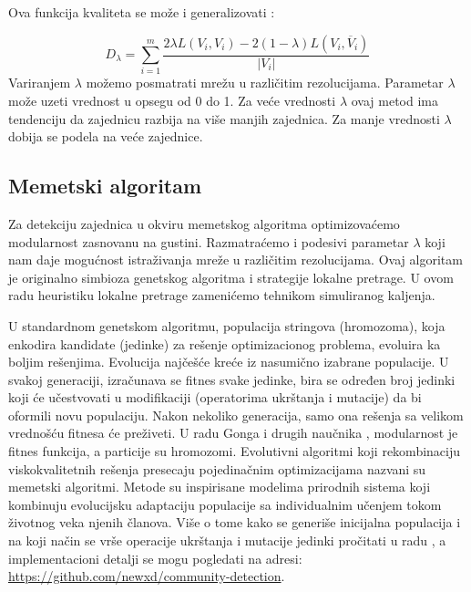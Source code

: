 \documentclass[a4paper]{article}
\begin{document}
Ova funkcija kvaliteta se može i generalizovati \cite{gong2011memetic}:

\begin{equation} D_{\lambda} = \sum_{i = 1}^{m} \frac{2 \lambda L(V_{i},  V_{i}) - 2(1 - \lambda)L(V_{i}, \overline V_{i})}{|V_{i}|} 
\end{equation} Variranjem $\lambda$ možemo posmatrati mrežu u različitim rezolucijama. Parametar $\lambda$ može uzeti vrednost u opsegu od 0 do 1. Za veće vrednosti $\lambda$ ovaj metod ima tendenciju da zajednicu razbija na više manjih zajednica. Za manje vrednosti $\lambda$ dobija se podela na veće zajednice.



\subsection{Memetski algoritam}
Za detekciju zajednica u okviru memetskog  algoritma \cite{gong2011memetic} optimizovaćemo modularnost zasnovanu na gustini. Razmatraćemo i podesivi parametar $\lambda$ koji nam daje mogućnost istraživanja mreže u različitim rezolucijama. Ovaj algoritam je originalno simbioza genetskog algoritma i strategije lokalne pretrage. U ovom radu heuristiku lokalne pretrage zamenićemo tehnikom simuliranog kaljenja. 

U standardnom genetskom algoritmu, populacija stringova (hromozoma), koja enkodira kandidate (jedinke) za rešenje optimizacionog problema, evoluira ka boljim rešenjima. Evolucija najčešće kreće iz nasumično izabrane populacije. U svakoj generaciji, izračunava se fitnes svake jedinke, bira se određen broj jedinki koji će učestvovati u modifikaciji (operatorima ukrštanja i mutacije) da bi oformili novu populaciju. Nakon nekoliko generacija, samo ona rešenja sa velikom vrednošću fitnesa će preživeti. U radu Gonga i drugih naučnika \cite{gong2011memetic}, modularnost je fitnes funkcija, a particije su hromozomi. Evolutivni algoritmi koji rekombinaciju viskokvalitetnih rešenja presecaju pojedinačnim optimizacijama nazvani su memetski algoritmi. Metode su inspirisane modelima prirodnih sistema koji kombinuju evolucijsku adaptaciju populacije sa individualnim učenjem tokom životnog veka njenih članova. Više o tome kako se generiše inicijalna populacija i na koji način se vrše operacije ukrštanja i mutacije jedinki pročitati u radu \cite{gong2011memetic}, a implementacioni detalji se mogu pogledati na adresi: \url{https://github.com/newxd/community-detection}.
\end{document}

